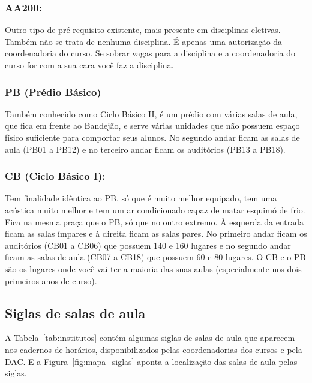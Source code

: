 \subsubsection{AA200:} Outro tipo de pré-requisito existente, mais presente em
disciplinas eletivas. Também não se trata de nenhuma disciplina. É apenas uma
autorização da coordenadoria do curso. Se sobrar vagas para a disciplina e a
coordenadoria do curso for com a sua cara você faz a disciplina.

\subsubsection{PB (Prédio Básico)} Também conhecido como Ciclo Básico II, é um
prédio com várias salas de aula, que fica em frente ao Bandejão, e serve várias
unidades que não possuem espaço físico suficiente para comportar seus alunos. No
segundo andar ficam as salas de aula (PB01 a PB12) e no terceiro andar ficam os
auditórios (PB13 a PB18).

\subsubsection{CB (Ciclo Básico I):} Tem finalidade idêntica ao PB, só que é
muito melhor equipado, tem uma acústica muito melhor e tem um ar condicionado
capaz de matar esquimó de frio. Fica na mesma praça que o PB, só que no outro
extremo. À esquerda da entrada ficam as salas ímpares e à direita ficam as salas
pares. No primeiro andar ficam os auditórios (CB01 a CB06) que possuem 140 e 160
lugares e no segundo andar ficam as salas de aula (CB07 a CB18) que possuem 60 e
80 lugares.  O CB e o PB são os lugares onde você vai ter a maioria das suas
aulas (especialmente nos dois primeiros anos de curso).

\subsection{Siglas de salas de aula}

A Tabela~\ref{tab:institutos} contém algumas siglas de salas de aula que
aparecem nos cadernos de horários, disponibilizados pelas coordenadorias dos
cursos e pela DAC. E a Figura~\ref{fig:mapa_siglas} aponta a localização das
salas de aula pelas siglas.

